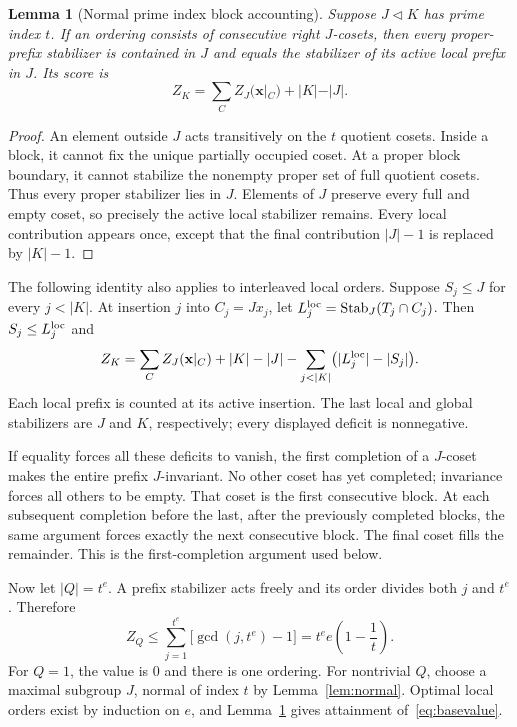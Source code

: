 \documentclass[11pt,letterpaper]{article}
\newtheorem{lemma}[theorem]{Lemma}
\theoremstyle{definition}\newtheorem{definition}{Definition}
\newcommand{\Stab}{\operatorname{Stab}}
\begin{document}
\begin{lemma}[Normal prime index block accounting]\label{lem:block}
Suppose $J\lhd K$ has prime index $t$. If an ordering consists of consecutive right $J$-cosets, then every proper-prefix stabilizer is contained in $J$ and equals the stabilizer of its active local prefix in $J$. Its score is
\begin{equation}
Z_K=\sum_C Z_J(\mathbf{x}|_C)+|K|-|J|.\label{eq:block}
\end{equation}
\end{lemma}
\begin{proof}
An element outside $J$ acts transitively on the $t$ quotient cosets. Inside a block, it cannot fix the unique partially occupied coset. At a proper block boundary, it cannot stabilize the nonempty proper set of full quotient cosets. Thus every proper stabilizer lies in $J$. Elements of $J$ preserve every full and empty coset, so precisely the active local stabilizer remains. Every local contribution appears once, except that the final contribution $|J|-1$ is replaced by $|K|-1$.
\end{proof}

The following identity also applies to interleaved local orders. Suppose $S_j\le J$ for every $j<|K|$. At insertion $j$ into $C_j=Jx_j$, let $L_j^{\rm loc}=\Stab_J(T_j\cap C_j)$. Then $S_j\le L_j^{\rm loc}$ and
\begin{equation}
Z_K=\sum_C Z_J(\mathbf{x}|_C)+|K|-|J|
-\sum_{j<|K|}\bigl(|L_j^{\rm loc}|-|S_j|\bigr).\label{eq:local}
\end{equation}
Each local prefix is counted at its active insertion. The last local and global stabilizers are $J$ and $K$, respectively; every displayed deficit is nonnegative.

If equality forces all these deficits to vanish, the first completion of a $J$-coset makes the entire prefix $J$-invariant. No other coset has yet completed; invariance forces all others to be empty. That coset is the first consecutive block. At each subsequent completion before the last, after the previously completed blocks, the same argument forces exactly the next consecutive block. The final coset fills the remainder. This is the first-completion argument used below.

Now let $|Q|=t^e$. A prefix stabilizer acts freely and its order divides both $j$ and $t^e$. Therefore
\begin{equation}
Z_Q\le\sum_{j=1}^{t^e}\bigl[\gcd(j,t^e)-1\bigr]
=t^e e\left(1-\frac1t\right).\label{eq:basevalue}
\end{equation}
For $Q=1$, the value is $0$ and there is one ordering. For nontrivial $Q$, choose a maximal subgroup $J$, normal of index $t$ by Lemma~\ref{lem:normal}. Optimal local orders exist by induction on $e$, and Lemma~\ref{lem:block} gives attainment of~\eqref{eq:basevalue}.
\end{document}
